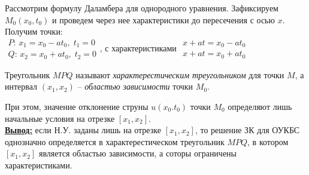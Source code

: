 Рассмотрим формулу Даламбера для однородного уравнения. Зафиксируем $M_0(x_0,t_0)$ и проведем через нее характеристики до пересечения с осью $x$. Получим точки:\\
$\displaystyle\begin{array}{ll}P:\,x_1=x_0-at_0,\;t_1=0\\Q:\,x_2=x_0+at_0,\;t_2=0\end{array}$, с характеристиками
$\displaystyle\begin{array}{ll}x+at=x_0-at_0\\x+at=x_0+at_0\end{array}$%
\begin{definition}
	Треугольник $MPQ$ называют \emph{характерестическим треугольником} для точки $M$, а интервал $(x_1,x_2)$ -- \emph{областью зависимости} точки $M_0$.
\end{definition}
При этом, значение отклонение струны $u(x_0.t_0)$ точки $M_0$ определяют лишь начальные условия на отрезке $[x_1,x_2]$.\\
\textbf{\underline{Вывод:}} если Н.У. заданы лишь на отрезке $[x_1,x_2]$, то решение ЗК для ОУКБС однозначно определяется в характерестическом треугольник $MPQ$, в котором $[x_1,x_2]$ является областью зависимости, а соторы ограничены характеристиками.


